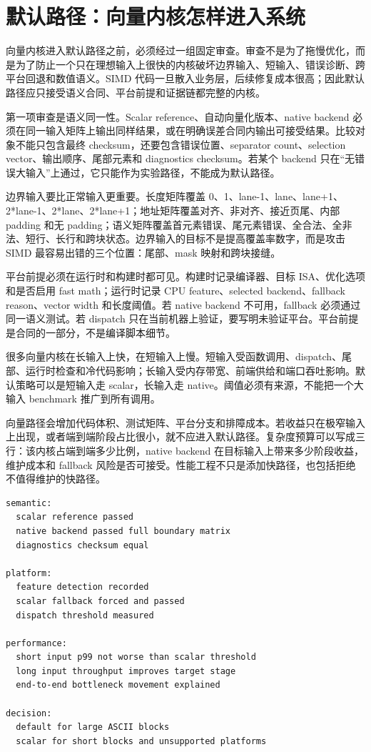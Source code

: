\section{默认路径：向量内核怎样进入系统}

向量内核进入默认路径之前，必须经过一组固定审查。审查不是为了拖慢优化，而是为了防止一个只在理想输入上很快的内核破坏边界输入、短输入、错误诊断、跨平台回退和数值语义。SIMD 代码一旦散入业务层，后续修复成本很高；因此默认路径应只接受语义合同、平台前提和证据链都完整的内核。

第一项审查是语义同一性。Scalar reference、自动向量化版本、native backend 必须在同一输入矩阵上输出同样结果，或在明确误差合同内输出可接受结果。比较对象不能只包含最终 checksum，还要包含错误位置、separator count、selection vector、输出顺序、尾部元素和 diagnostics checksum。若某个 backend 只在“无错误大输入”上通过，它只能作为实验路径，不能成为默认路径。

边界输入要比正常输入更重要。长度矩阵覆盖 0、1、lane-1、lane、lane+1、2*lane-1、2*lane、2*lane+1；地址矩阵覆盖对齐、非对齐、接近页尾、内部 padding 和无 padding；语义矩阵覆盖首元素错误、尾元素错误、全合法、全非法、短行、长行和跨块状态。边界输入的目标不是提高覆盖率数字，而是攻击 SIMD 最容易出错的三个位置：尾部、mask 映射和跨块接缝。

平台前提必须在运行时和构建时都可见。构建时记录编译器、目标 ISA、优化选项和是否启用 fast math；运行时记录 CPU feature、selected backend、fallback reason、vector width 和长度阈值。若 native backend 不可用，fallback 必须通过同一语义测试。若 dispatch 只在当前机器上验证，要写明未验证平台。平台前提是合同的一部分，不是编译脚本细节。

很多向量内核在长输入上快，在短输入上慢。短输入受函数调用、dispatch、尾部、运行时检查和冷代码影响；长输入受内存带宽、前端供给和端口吞吐影响。默认策略可以是短输入走 scalar，长输入走 native。阈值必须有来源，不能把一个大输入 benchmark 推广到所有调用。

向量路径会增加代码体积、测试矩阵、平台分支和排障成本。若收益只在极窄输入上出现，或者端到端阶段占比很小，就不应进入默认路径。复杂度预算可以写成三行：该内核占端到端多少比例，native backend 在目标输入上带来多少阶段收益，维护成本和 fallback 风险是否可接受。性能工程不只是添加快路径，也包括拒绝不值得维护的快路径。

\begin{lstlisting}[numbers=none,caption={向量内核上线审查摘要}]
semantic:
  scalar reference passed
  native backend passed full boundary matrix
  diagnostics checksum equal

platform:
  feature detection recorded
  scalar fallback forced and passed
  dispatch threshold measured

performance:
  short input p99 not worse than scalar threshold
  long input throughput improves target stage
  end-to-end bottleneck movement explained

decision:
  default for large ASCII blocks
  scalar for short blocks and unsupported platforms
\end{lstlisting}

